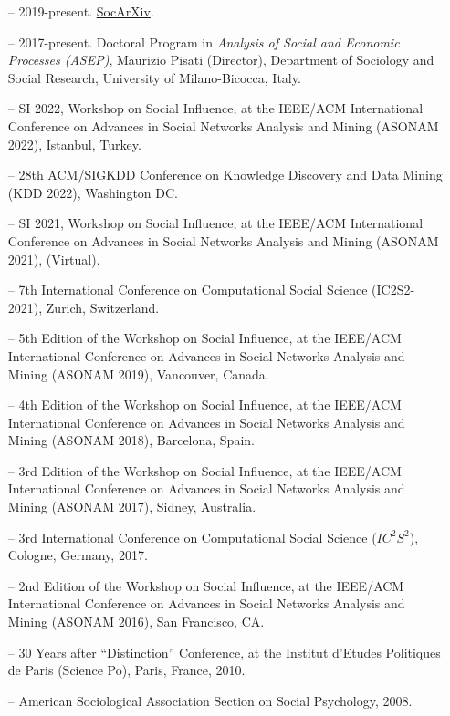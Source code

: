 \begin{itemize}[itemsep=-0.5ex]
    \item[--] 2019-present. \href{https://socopen.org/}{SocArXiv}.
	\item[--] 2017-present. Doctoral Program in {\em Analysis of Social and Economic Processes (ASEP)}, Maurizio Pisati (Director), Department of Sociology and Social Research, University of Milano-Bicocca, Italy. 
\end{itemize}


\begin{itemize}[itemsep=-0.5ex]

\item[--] SI 2022, Workshop on Social Influence, at the IEEE/ACM International Conference on Advances in Social Networks Analysis and Mining (ASONAM 2022), Istanbul, Turkey.


\item[--] 28th ACM/SIGKDD Conference on Knowledge Discovery and Data Mining (KDD 2022), Washington DC.

\item[--] SI 2021, Workshop on Social Influence, at the IEEE/ACM International Conference on Advances in Social Networks Analysis and Mining (ASONAM 2021), (Virtual).

\item[--] 7th International Conference on Computational Social Science (IC2S2-2021), Zurich, Switzerland.

\item[--] 5th Edition of the Workshop on Social Influence, at the IEEE/ACM International Conference on Advances in Social Networks Analysis and Mining (ASONAM 2019), Vancouver, Canada. 

\item[--] 4th Edition of the Workshop on Social Influence, at the IEEE/ACM International Conference on Advances in Social Networks Analysis and Mining (ASONAM 2018), Barcelona, Spain. 

\item[--] 3rd Edition of the Workshop on Social Influence, at the IEEE/ACM International Conference on Advances in Social Networks Analysis and Mining (ASONAM 2017), Sidney, Australia. 

\item[--] 3rd International Conference on Computational Social Science ($IC^2S^2$), Cologne, Germany, 2017. 

\item[--] 2nd Edition of the Workshop on Social Influence, at the IEEE/ACM International Conference on Advances in Social Networks Analysis and Mining (ASONAM 2016), San Francisco, CA. 

\item[--] 30 Years after ``Distinction'' Conference, at the Institut d'Etudes Politiques de Paris (Science Po), Paris, France, 2010.

\item[--] American Sociological Association Section on Social Psychology, 2008.
\end{itemize}